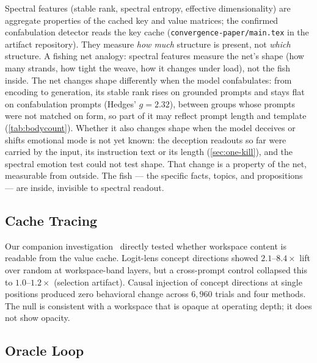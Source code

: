 \documentclass[11pt,a4paper]{article}
\begin{document}
Spectral features (stable rank, spectral entropy, effective
dimensionality) are aggregate properties of the cached key and value
matrices; the confirmed confabulation detector reads the key cache
(\nolinkurl{convergence-paper/main.tex} in the artifact repository).
They measure \emph{how much} structure is present, not
\emph{which} structure. A fishing net analogy: spectral features
measure the net's shape (how many strands, how tight the weave, how
it changes under load), not the fish inside. The net changes shape
differently when the model confabulates: from encoding to generation,
its stable rank rises on grounded prompts and stays flat on
confabulation prompts (Hedges' $g{=}2.32$), between groups whose
prompts were not matched on form, so part of it may reflect prompt
length and template (\cref{tab:bodycount}).
Whether it also changes shape when the model deceives or shifts
emotional mode is not yet known: the deception readouts so far were
carried by the input, its instruction text or its length
(\cref{sec:one-kill}), and the spectral
emotion test could not test shape. That change is a property of the
net, measurable from outside. The fish --- the specific facts, topics, and propositions ---
are inside, invisible to spectral readout.

\subsection{Cache Tracing}

Our companion investigation~\citep{lyra2026cache_tracing} directly
tested whether workspace content is readable from the value cache.
Logit-lens concept directions showed $2.1$--$8.4\times$ lift over
random at workspace-band layers, but a cross-prompt control collapsed
this to $1.0$--$1.2\times$ (selection artifact). Causal injection of
concept directions at single positions produced zero behavioral change
across $6{,}960$ trials and four methods. The null is consistent with a
workspace that is opaque at operating depth; it does not show opacity.

\subsection{Oracle Loop}
\end{document}
